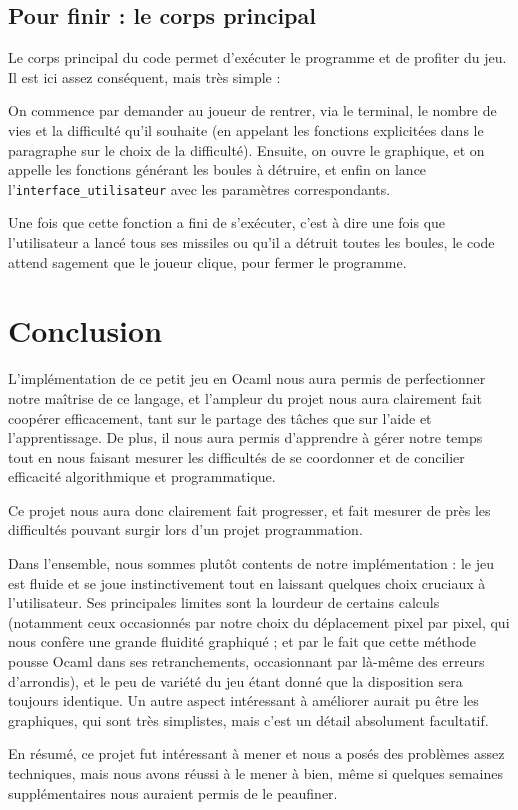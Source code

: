 \documentclass[10pt]{article}
\begin{document}
\subsection{Pour finir : le corps principal}
Le corps principal du code permet d'exécuter le programme et de profiter du jeu. Il est ici assez conséquent, mais très simple :
\par On commence par demander au joueur de rentrer, via le terminal, le nombre de vies et la difficulté qu'il souhaite (en appelant les fonctions explicitées dans le paragraphe sur le choix de la difficulté). Ensuite, on ouvre le graphique,
et on appelle les fonctions générant les boules à détruire, et enfin on lance l'\texttt{interface\_utilisateur} avec les paramètres correspondants.
\par Une fois que cette fonction a fini de s'exécuter, c'est à dire une fois que l'utilisateur a lancé tous ses missiles ou qu'il a
détruit toutes les boules, le code attend sagement que le joueur clique, pour fermer le programme.



\section*{Conclusion}


L'implémentation de ce petit jeu en Ocaml nous aura permis de perfectionner notre maîtrise de ce langage, et l'ampleur du projet nous
aura clairement fait coopérer efficacement, tant sur le partage des tâches que sur l'aide et l'apprentissage. De plus, il nous aura
permis d'apprendre à gérer notre temps tout en nous faisant mesurer les difficultés de se coordonner et de concilier efficacité algorithmique
et programmatique.
\par Ce projet nous aura donc clairement fait progresser, et fait mesurer de près les difficultés pouvant surgir lors d'un projet programmation.
\par Dans l'ensemble, nous sommes plutôt contents de notre implémentation : le jeu est fluide et se joue instinctivement tout en laissant
quelques choix cruciaux à l'utilisateur. Ses principales limites sont la lourdeur de certains calculs (notamment ceux occasionnés par notre
choix du déplacement pixel par pixel, qui nous confère une grande fluidité graphiqué ; et par le fait que cette méthode pousse Ocaml dans ses
retranchements, occasionnant par là-même des erreurs d'arrondis), et le peu de variété du jeu étant donné que la disposition sera toujours identique.
Un autre aspect intéressant à améliorer aurait pu être les graphiques, qui sont très simplistes, mais c'est un détail absolument facultatif.
\par En résumé, ce projet fut intéressant à mener et nous a posés des problèmes assez techniques, mais nous avons réussi à le mener à bien,
même si quelques semaines supplémentaires nous auraient permis de le peaufiner.
 
\end{document}
